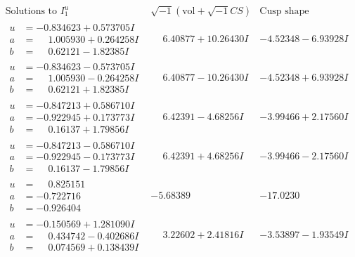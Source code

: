 \documentclass[1p]{elsarticle_modified}
\theoremstyle{definition}
\newcommand{\I}{\sqrt{-1}}
\begin{document}
$$\begin{array}{c|c|c}  
\text{Solutions to }I^u_{1}& \I (\text{vol} + \sqrt{-1}CS) & \text{Cusp shape}\\
 \hline 
\begin{aligned}
u &= -0.834623 + 0.573705 I \\
a &= \phantom{-}1.005930 + 0.264258 I \\
b &= \phantom{-}0.62121 - 1.82385 I\end{aligned}
 & \phantom{-}6.40877 + 10.26430 I & -4.52348 - 6.93928 I \\ \hline\begin{aligned}
u &= -0.834623 - 0.573705 I \\
a &= \phantom{-}1.005930 - 0.264258 I \\
b &= \phantom{-}0.62121 + 1.82385 I\end{aligned}
 & \phantom{-}6.40877 - 10.26430 I & -4.52348 + 6.93928 I \\ \hline\begin{aligned}
u &= -0.847213 + 0.586710 I \\
a &= -0.922945 + 0.173773 I \\
b &= \phantom{-}0.16137 + 1.79856 I\end{aligned}
 & \phantom{-}6.42391 - 4.68256 I & -3.99466 + 2.17560 I \\ \hline\begin{aligned}
u &= -0.847213 - 0.586710 I \\
a &= -0.922945 - 0.173773 I \\
b &= \phantom{-}0.16137 - 1.79856 I\end{aligned}
 & \phantom{-}6.42391 + 4.68256 I & -3.99466 - 2.17560 I \\ \hline\begin{aligned}
u &= \phantom{-}0.825151\phantom{ +0.000000I} \\
a &= -0.722716\phantom{ +0.000000I} \\
b &= -0.926404\phantom{ +0.000000I}\end{aligned}
 & -5.68389\phantom{ +0.000000I} & -17.0230\phantom{ +0.000000I} \\ \hline\begin{aligned}
u &= -0.150569 + 1.281090 I \\
a &= \phantom{-}0.434742 - 0.402686 I \\
b &= \phantom{-}0.074569 + 0.138439 I\end{aligned}
 & \phantom{-}3.22602 + 2.41816 I & -3.53897 - 1.93549 I \\ \hline\begin{aligned}

\end{aligned}
\end{array}$$
\end{document}
